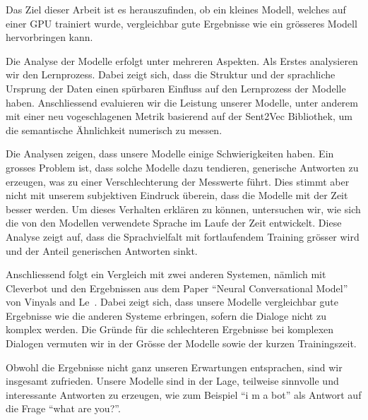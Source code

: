 Das Ziel dieser Arbeit ist es herauszufinden, ob ein kleines Modell, welches auf einer GPU trainiert wurde, vergleichbar gute Ergebnisse wie ein grösseres Modell hervorbringen kann.

Die Analyse der Modelle erfolgt unter mehreren Aspekten. Als Erstes analysieren wir den Lernprozess. Dabei zeigt sich, dass die Struktur und der sprachliche Ursprung der Daten einen spürbaren Einfluss auf den Lernprozess der Modelle haben. Anschliessend evaluieren wir die Leistung unserer Modelle, unter anderem mit einer neu vogeschlagenen Metrik basierend auf der Sent2Vec Bibliothek, um die semantische Ähnlichkeit numerisch zu messen.

Die Analysen zeigen, dass unsere Modelle einige Schwierigkeiten haben. Ein grosses Problem ist, dass solche Modelle dazu tendieren, generische Antworten zu erzeugen, was zu einer Verschlechterung der Messwerte führt. Dies stimmt aber nicht mit unserem subjektiven Eindruck überein, dass die Modelle mit der Zeit besser werden. Um dieses Verhalten erklären zu können, untersuchen wir, wie sich die von den Modellen verwendete Sprache im Laufe der Zeit entwickelt. Diese Analyse zeigt auf, dass die Sprachvielfalt mit fortlaufendem Training grösser wird und der Anteil generischen Antworten sinkt.

Anschliessend folgt ein Vergleich mit zwei anderen Systemen, nämlich mit Cleverbot und den Ergebnissen aus dem Paper ``Neural Conversational Model'' von Vinyals and Le~\cite{Vinyals:2015}. Dabei zeigt sich, dass unsere Modelle vergleichbar gute Ergebnisse wie die anderen Systeme erbringen, sofern die Dialoge nicht zu komplex werden. Die Gründe für die schlechteren Ergebnisse bei komplexen Dialogen vermuten wir in der Grösse der Modelle sowie der kurzen Trainingszeit.

Obwohl die Ergebnisse nicht ganz unseren Erwartungen entsprachen, sind wir insgesamt zufrieden. Unsere Modelle sind in der Lage, teilweise sinnvolle und interessante Antworten zu erzeugen, wie zum Beispiel ``i m a bot'' als Antwort auf die Frage ``what are you?''.